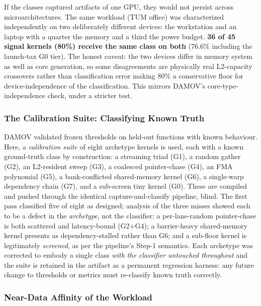 If the classes captured artifacts of one GPU, they would not persist across microarchitectures. The same workload (TUM office) was characterized independently on two deliberately different devices: the  workstation and an  laptop with a quarter the memory and a third the power budget. \textbf{36 of 45 signal kernels (80\%) receive the same class on both} (76.6\% including the launch-tax G0 tier). The honest caveat: the two devices differ in memory system as well as core generation, so some disagreements are physically real L2-capacity crossovers rather than classification error making 80\% a conservative floor for device-independence of the classification. This mirrors DAMOV's core-type-independence check, under a stricter test.

\subsubsection{The Calibration Suite: Classifying Known Truth}
\label{sec:char-calibration}

DAMOV validated frozen thresholds on held-out functions with known behaviour. Here, a \emph{calibration suite} of eight archetype kernels is used, each with a known ground-truth class by construction: a streaming triad (G1), a random gather (G2), an L2-resident sweep (G3), a coalesced pointer-chase (G4), an FMA polynomial (G5), a bank-conflicted shared-memory kernel (G6), a single-warp dependency chain (G7), and a sub-screen tiny kernel (G0). These are compiled and pushed through the identical capture-and-classify pipeline, blind. The first pass classified five of eight as designed; analysis of the three misses showed each to be a defect in the \emph{archetype}, not the classifier: a per-lane-random pointer-chase is both scattered and latency-bound (G2+G4); a barrier-heavy shared-memory kernel presents as dependency-stalled rather than G6; and a sub-floor kernel is legitimately \emph{screened}, as per the pipeline's Step-1 semantics. Each archetype was corrected to embody a single class \emph{with the classifier untouched throughout} and the suite is retained in the artifact as a permanent regression harness: any future change to thresholds or metrics must re-classify known truth correctly.

\subsubsection{Near-Data Affinity of the Workload}
\label{sec:char-affinity}

